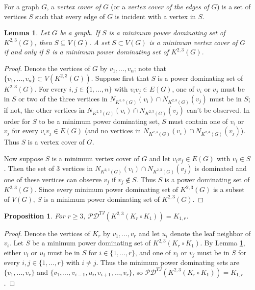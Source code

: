 \documentclass{article}
\numberwithin{figure}{section}   %
\newtheorem{lem}[thm]{Lemma}
\newtheorem{prop}[thm]{Proposition}
\theoremstyle{definition}
\theoremstyle{definition}
\theoremstyle{definition}
\newcommand{\bpf}{\begin{proof}}
\newcommand{\epf}{\end{proof}\ms}
\newcommand{\ms}{\medskip}
\newcommand{\te}{\mathscr{PD}^{TJ}}
\newcommand{\bj}[1]{{\textcolor{red}{[}\textcolor{red}{{BJ: \em #1}]}}}
\begin{document}
For a graph $G$,  a {\em vertex cover of $G$} (or a {\em vertex cover of the edges of $G$}) is a set of vertices $S$ such that every edge of $G$ is incident with a vertex in $S$.  

\begin{lem}\label{cover-K23G} Let $G$ be a graph.   If $S$ is a minimum power dominating set  of $K^{2,3}(G)$, then  $S\subseteq V(G)$. A set $S\subset V(G)$ is a  minimum vertex cover of  $G$ if and only if $S$ is a minimum power dominating set of $K^{2,3}(G)$.
 \end{lem}
\bpf
Denote the vertices of $G$ by $v_1,\dots,v_n$; note that $\{v_1,\dots,v_n\}\subset V(K^{2,3}(G))$.   Suppose first that $S$ is a power dominating set of $K^{2,3}(G)$. For every  $i,j\in\{1,\dots,n\}$ with $v_iv_j\in E(G)$,  one of $v_i$ or $v_j$ must be in $S$ or two of the three vertices in $N_{K^{2,3}(G)}(v_i) \cap N_{K^{2,3}(G)}(v_j)$ must be in $S$; if not, the other vertices  in $N_{K^{2,3}(G)}(v_i) \cap N_{K^{2,3}(G)}(v_j)$ can’t be observed.    %
In order for $S$ to be a minimum power dominating set, $S$  must contain one of $v_i$ or $v_j$ for every $v_iv_j\in E(G)$ (and no vertices in $N_{K^{2,3}(G)}(v_i) \cap N_{K^{2,3}(G)}(v_j)$).  Thus $S$ is a vertex cover  of $G$. 

Now suppose $S$ is a minimum vertex cover of $G$ and let $v_iv_j\in E(G)$ with $v_i\in S$. Then the set of 3 vertices in $N_{K^{2,3}(G)}(v_i) \cap N_{K^{2,3}(G)}(v_j)$ is dominated and one of these vertices can observe $v_j$ if $v_j\not\in S$.  Thus $S$ is a power dominating set of $K^{2,3}(G)$. Since every minimum  power dominating set of $K^{2,3}(G)$ is a subset of $V(G)$, $S$ is a minimum  power dominating set of $K^{2,3}(G)$.
 \epf


\begin{prop} For $r\ge 3$, $\te(K^{2,3}(K_r\circ K_1))=K_{1,r}$.
 \end{prop}
\bpf
 Denote the vertices of $K_r$ by $v_1,\dots,v_r$ and let $u_i$ denote the leaf neighbor of $v_i$. Let $S$ be a minimum power dominating set of $K^{2,3}(K_r\circ K_1)$.  By Lemma \ref{cover-K23G}, either $v_i$ or $u_i$ must be in $S$ for $i\in\{1,\dots,r\}$, and   one of $v_i$ or $v_j$ must be in $S$ for every  $i,j\in\{1,\dots,r\}$ with $i\ne j$. Thus the minimum power dominating sets are $\{v_1,\dots,v_r\}$ and $\{v_1,\dots,v_{i-1},u_i,v_{i+1},\dots,v_r\}$, so $\te(K^{2,3}(K_r\circ K_1))=K_{1,r}$.  \epf
\end{document}
